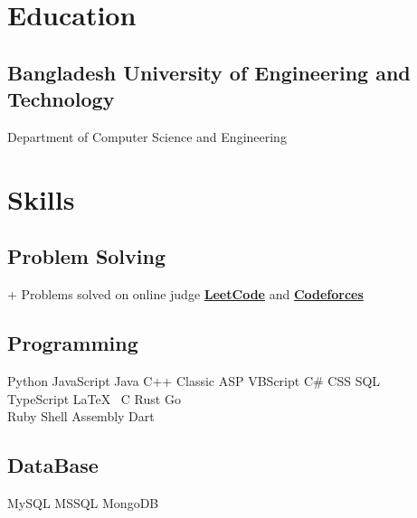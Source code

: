 \documentclass[]{plushcv}
\begin{document}
\hfill
\begin{minipage}[t]{0.34\textwidth} 

\section{Education} 
\subsection{Bangladesh University of Engineering and Technology}
Department of Computer Science and Engineering \\
\sectionsep



\section{Skills}
\subsection{Problem Solving}
+ Problems solved on online judge 
\href{https://leetcode.com/An1ndya/}{\textbf{LeetCode}}
and 
\href{https://codeforces.com/profile/an1ndya}{\textbf{Codeforces}} 
\sectionsep
\sectionsep
\subsection{Programming}
\sectionsep
{}
Python\textbullet{} JavaScript \textbullet{} Java \textbullet{}   C++ \textbullet{}
 Classic ASP  \textbullet{} VBScript \textbullet{}  C\#   \textbullet{} CSS \textbullet{} 
 SQL \\
\sectionsep
{}
TypeScript \textbullet{} \LaTeX\ \textbullet{} C \textbullet{} 
Rust  \textbullet{} Go \\
\sectionsep
{}
Ruby \textbullet{}  Shell \textbullet{} Assembly \textbullet{}  Dart  \\
\sectionsep
\subsection{DataBase}
\sectionsep
MySQL \textbullet{} MSSQL \textbullet{} MongoDB  \\
\sectionsep

\end{minipage}
\end{document}
